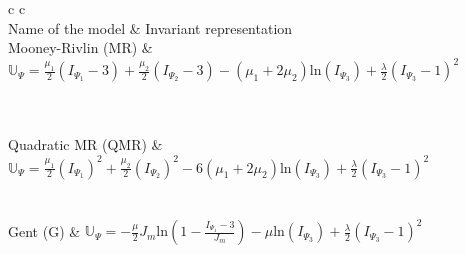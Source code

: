 \begin{table}[htbp!]
	\centering
	\begin{tabular}{c c}
			\\	
\midrule
{} {Name of the model}   &  Invariant representation		\\	
%
       \midrule %
%
Mooney-Rivlin (MR) & $\mathbb{U}_{\Psi}  = \frac{\mu_1}{2} \left(I_{\Psi_1} - 3 \right) + \frac{\mu_2}{2} \left(I_{\Psi_2} - 3 \right) - \left( \mu_1 + 2\mu_2 \right) \text{ln} \left(I_{\Psi_3} \right) + \frac{\lambda}{2}  \left( I_{\Psi_3} - 1 \right)^2$\\
%
\\
\\

       \midrule %

%
Quadratic MR (QMR)  &  $\mathbb{U}_{\Psi} = \frac{\mu_1}{2} \left(I_{\Psi_1} \right)^2 + \frac{\mu_2}{2} \left(I_{\Psi_2} \right)^2 - 6 \left( \mu_1 + 2\mu_2 \right) \text{ln} \left(I_{\Psi_3} \right) + \frac{\lambda}{2}  \left( I_{\Psi_3} - 1 \right)^2 $\\
%
%
\\

\\

%
%
       \midrule %
Gent (G)  &  $\mathbb{U}_{\Psi} = - \frac{\mu }{2}  J_m\text{ln}\left( 1 - \frac{I_{\Psi_1} - 3}{J_m} \right) - \mu \text{ln} \left(I_{\Psi_3} \right) + \frac{\lambda}{2}  \left( I_{\Psi_3} - 1 \right)^2 $\\
%
%
\\


\end{tabular}
\end{table}
